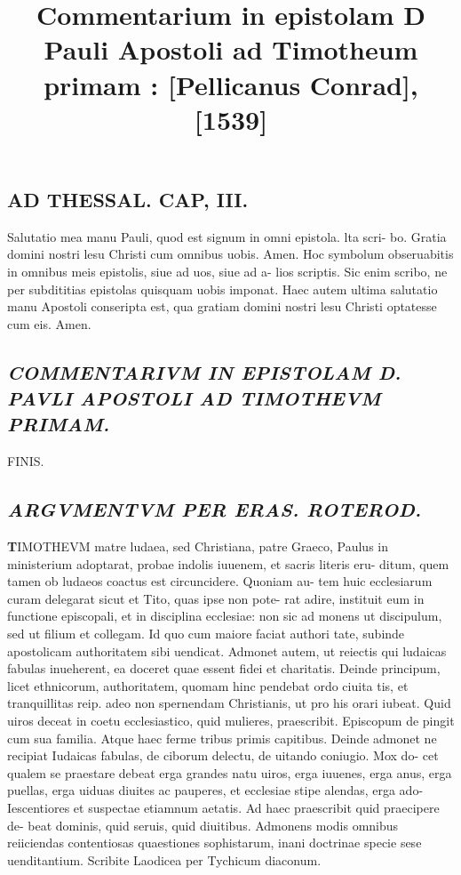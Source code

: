 \documentclass{article}
\begin{document}
\date{}
        \title{Commentarium in epistolam D Pauli Apostoli ad Timotheum primam : [Pellicanus Conrad], [1539]}
\maketitle
\tableofcontents
\clearpage
\begin{pages} 
\beginnumbering
        
\section*{AD THESSAL. CAP, III. }
\marginpar{[ p.463 ]}\pstart Salutatio mea manu Pauli, quod est signum in omni epistola. lta scri- bo. Gratia domini nostri lesu Christi cum omnibus uobis. Amen.  \pend\pstart Hoc symbolum obseruabitis in omnibus meis epistolis, siue ad uos, siue ad a- lios scriptis. Sic enim scribo, ne per subdititias epistolas quisquam uobis imponat. Haec autem ultima salutatio manu Apostoli conseripta est, qua gratiam domini nostri lesu Christi optatesse cum eis. Amen.  \pend
{}
{}
\subsection*{\textit{COMMENTARIVM IN EPISTOLAM D. PAVLI APOSTOLI AD TIMOTHEVM PRIMAM. }}\pstart FINIS.  \pend
{}
{}
\subsection*{\textit{ARGVMENTVM PER ERAS. ROTEROD. }}\pstart \huge\textbf{T}\normalsize IMOTHEVM matre ludaea, sed Christiana, patre Graeco, Paulus in ministerium adoptarat, probae indolis iuuenem, et sacris literis eru- ditum, quem tamen ob ludaeos coactus est circuncidere. Quoniam au- tem huic ecclesiarum curam delegarat sicut et Tito, quas ipse non pote- rat adire, instituit eum in functione episcopali, et in disciplina ecclesiae: non sic ad monens ut discipulum, sed ut filium et collegam. Id quo cum maiore faciat authori tate, subinde apostolicam authoritatem sibi uendicat. Admonet autem, ut reiectis qui ludaicas fabulas inueherent, ea doceret quae essent fidei et charitatis. Deinde principum, licet ethnicorum, authoritatem, quomam hinc pendebat ordo ciuita tis, et tranquillitas reip. adeo non spernendam Christianis, ut pro his orari iubeat. Quid uiros deceat in coetu ecclesiastico, quid mulieres, praescribit. Episcopum de pingit cum sua familia. Atque haec ferme tribus primis capitibus. Deinde admonet ne recipiat Iudaicas fabulas, de ciborum delectu, de uitando coniugio. Mox do- cet qualem se praestare debeat erga grandes natu uiros, erga iuuenes, erga anus, erga puellas, erga uiduas diuites ac pauperes, et ecclesiae stipe alendas, erga ado- Iescentiores et suspectae etiamnum aetatis. Ad haec praescribit quid praecipere de- beat dominis, quid seruis, quid diuitibus. Admonens modis omnibus reiiciendas contentiosas quaestiones sophistarum, inani doctrinae specie sese uenditantium. Scribite Laodicea per Tychicum diaconum.  \pend
{}
{}

\end{pages}
\end{document}
